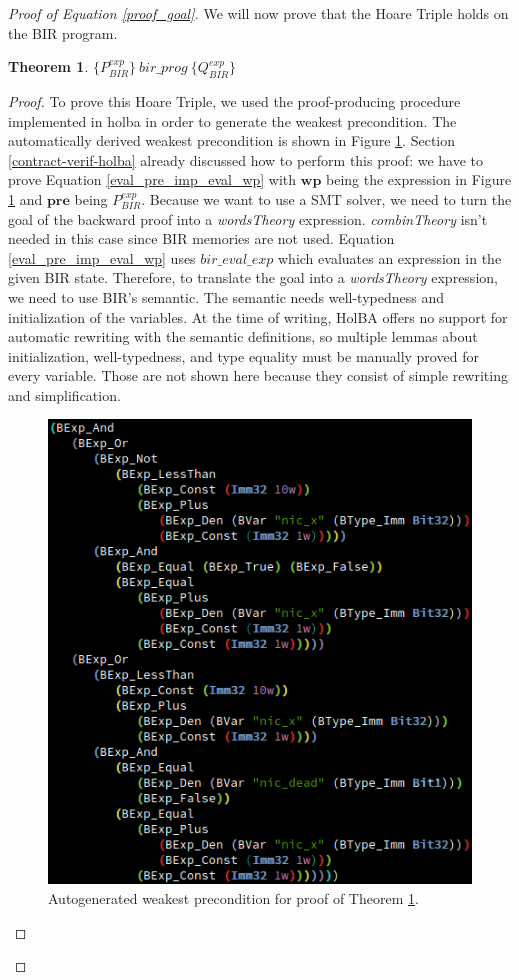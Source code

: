 \documentclass{kththesis}
\newcommand{\htriple}[3]{\ensuremath{\{#1\}~#2~\{#3\}}}
\newtheorem{theorem}{Theorem}[section]
\begin{document}
{\begin{proof}[Proof of Equation \ref{proof_goal}]
We will now prove that the Hoare Triple holds on the BIR program.
\bigskip

\begin{theorem} \label{proof_ht_thm}
\htriple{P^{exp}_{BIR}}{bir\_prog}{Q^{exp}_{BIR}}
\end{theorem}

\begin{proof}
To prove this Hoare Triple, we used the proof-producing procedure implemented in \gls{holba} in order to generate the weakest precondition. The automatically derived weakest precondition is shown in Figure \ref{proof_wp_exp}. Section \ref{contract-verif-holba} already discussed how to perform this proof: we have to prove Equation \ref{eval_pre_imp_eval_wp} with $\mathbf{wp}$ being the expression in Figure \ref{proof_wp_exp} and $\mathbf{pre}$ being $P^{exp}_{BIR}$. Because we want to use a \gls{SMT} solver, we need to turn the goal of the backward proof into a \textit{wordsTheory} expression. \textit{combinTheory} isn't needed in this case since BIR memories are not used. Equation \ref{eval_pre_imp_eval_wp} uses $bir\_eval\_exp$ which evaluates an expression in the given BIR state. Therefore, to translate the goal into a \textit{wordsTheory} expression, we need to use BIR's semantic. The semantic needs well-typedness and initialization of the variables. At the time of writing, HolBA offers no support for automatic rewriting with the semantic definitions, so multiple lemmas about initialization, well-typedness, and type equality must be manually proved for every variable. Those are not shown here because they consist of simple rewriting and simplification.

\begin{figure}[!h]
	\includegraphics[scale=.65]{figures/proof_wp_exp.png}
	\centering
	\caption{Autogenerated weakest precondition for proof of Theorem \ref{proof_ht_thm}.}
	\label{proof_wp_exp}
\end{figure}


\end{proof}
\end{proof}}
\end{document}
